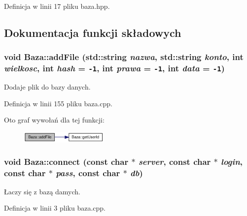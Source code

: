 Definicja w linii 17 pliku baza.hpp.

\subsection{Dokumentacja funkcji składowych}
\hypertarget{class_baza_f1bda4acd20e6fd00a35c43638e48956}{
\subsubsection[{addFile}]{\setlength{\rightskip}{0pt plus 5cm}void Baza::addFile (std::string {\em nazwa}, \/  std::string {\em konto}, \/  int {\em wielkosc}, \/  int {\em hash} = {\tt -1}, \/  int {\em prawa} = {\tt -1}, \/  int {\em data} = {\tt -1})}}
\label{class_baza_f1bda4acd20e6fd00a35c43638e48956}


Dodaje plik do bazy danych. 



Definicja w linii 155 pliku baza.cpp.

Oto graf wywołań dla tej funkcji:\nopagebreak
\begin{figure}[H]
\begin{center}
\leavevmode
\includegraphics[width=122pt]{class_baza_f1bda4acd20e6fd00a35c43638e48956_cgraph}
\end{center}
\end{figure}
\hypertarget{class_baza_bef61cc396e46d347a47c75e9ef8dfde}{
\subsubsection[{connect}]{\setlength{\rightskip}{0pt plus 5cm}void Baza::connect (const char $\ast$ {\em server}, \/  const char $\ast$ {\em login}, \/  const char $\ast$ {\em pass}, \/  const char $\ast$ {\em db})}}
\label{class_baza_bef61cc396e46d347a47c75e9ef8dfde}


Łaczy się z bazą damych. 



Definicja w linii 3 pliku baza.cpp.

